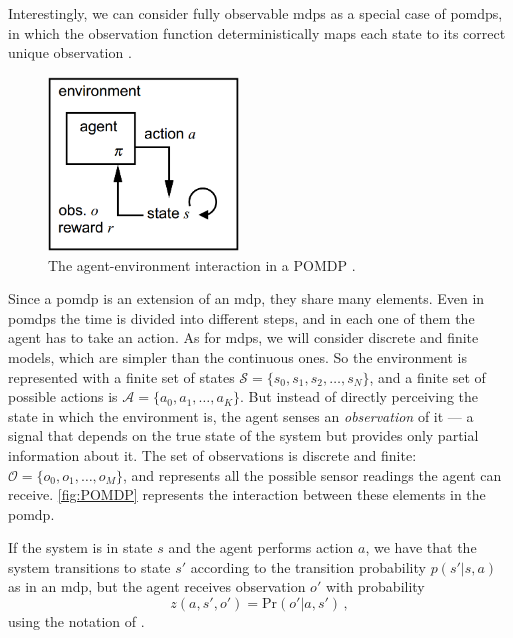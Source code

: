 Interestingly, we can consider fully observable \acrshort{mdp}s as a special case of \acrshort{pomdp}s, in which the observation function deterministically maps each state to its correct unique observation \cite{Poupart2010}.

\begin{figure}[ht]
    \centering
    \includegraphics[width=0.45\textwidth]{chapters/figures/POMDP-schema.png}
    \caption{The agent-environment interaction in a POMDP \cite{Spaan12pomdp}.}
    \label{fig:POMDP}
\end{figure}

Since a \acrshort{pomdp} is an extension of an \acrshort{mdp}, they share many elements. Even in \acrshort{pomdp}s the time is divided into different steps, and in each one of them the agent has to take an action. As for \acrshort{mdp}s, we will consider discrete and finite models, which are simpler than the continuous ones. So the environment is represented with a finite set of states $\mathcal S = \{ s_0, s_1, s_2, \ldots, s_N \}$, and a finite set of possible actions is $\mathcal A = \{a_0, a_1, \ldots, a_K\}$. But instead of directly perceiving the state in which the environment is, the agent senses an \emph{observation} of it --- a signal that depends on the true state of the system but provides only partial information about it. The set of observations is discrete and finite: $\mathcal O = \{o_0, o_1, \ldots, o_M\}$, and represents all the possible sensor readings the agent can receive. \autoref{fig:POMDP} represents the interaction between these elements in the \acrshort{pomdp}.

If the system is in state $s$ and the agent performs action $a$, we have that the system transitions to state $s'$ according to the transition probability $p(s' | s, a)$ as in an \acrshort{mdp}, but the agent receives observation $o'$ with probability
\begin{equation}
    z(a,s',o') = \text{Pr}(o' | a, s') \, ,
\end{equation}
using the notation of \cite{Poupart2010}.

